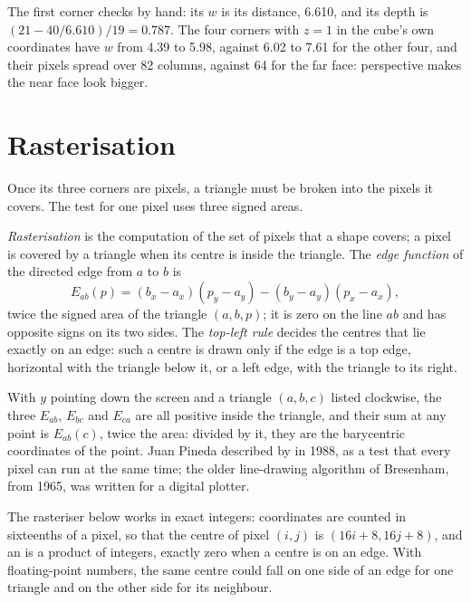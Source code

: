 The first corner checks by hand: its $w$ is its distance, 6.610, and its depth is $(21 - 40/6.610)/19 = 0.787$. The four corners with $z = 1$ in the cube's own coordinates have $w$ from 4.39 to 5.98, against 6.02 to 7.61 for the other four, and their pixels spread over 82 columns, against 64 for the far face: perspective makes the near face look bigger.

\section{Rasterisation}\label{sec:b3:computer-graphics:raster}

Once its three corners are pixels, a triangle must be broken into the pixels it covers. The test for one pixel uses three signed areas.

\begin{definition}\label{def:b3:computer-graphics:raster}
\emph{Rasterisation} is the computation of the set of pixels that a shape covers; a pixel is covered by a triangle when its centre is inside the triangle. The \emph{edge function} of the directed edge from $a$ to $b$ is
\[
E_{ab}(p) = (b_x - a_x)(p_y - a_y) - (b_y - a_y)(p_x - a_x),
\]
twice the signed area of the triangle $(a, b, p)$; it is zero on the line $ab$ and has opposite signs on its two sides. The \emph{top-left rule} decides the centres that lie exactly on an edge: such a centre is drawn only if the edge is a top edge, horizontal with the triangle below it, or a left edge, with the triangle to its right.
\end{definition}

With $y$ pointing down the screen and a triangle $(a, b, c)$ listed clockwise, the three  $E_{ab}$, $E_{bc}$ and $E_{ca}$ are all positive inside the triangle, and their sum at any point is $E_{ab}(c)$, twice the area: divided by it, they are the barycentric coordinates of the point. Juan Pineda described  by  in 1988, as a test that every pixel can run at the same time; the older line-drawing algorithm of Bresenham, from 1965, was written for a digital plotter. %

The rasteriser below works in exact integers: coordinates are counted in sixteenths of a pixel, so that the centre of pixel $(i, j)$ is $(16i + 8, 16j + 8)$, and an  is a product of integers, exactly zero when a centre is on an edge. With floating-point numbers, the same centre could fall on one side of an edge for one triangle and on the other side for its neighbour.

